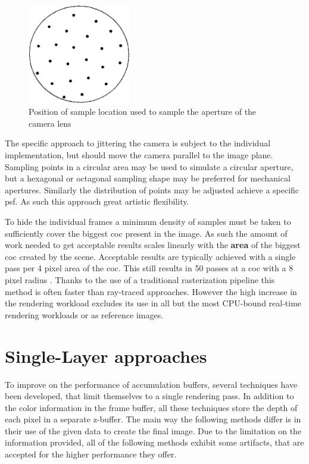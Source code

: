 \begin{figure}
\begin{center}
    \includegraphics[width=0.4\textwidth]{images/sample-locations.png}
\end{center}
\caption{Position of sample location used to sample the aperture of the camera lens \cite{Haeberli.1990}}
\label{fig:sample-pos}
\end{figure}

The specific approach to jittering the camera is subject to the individual implementation, but should move the camera parallel to the image plane.
Sampling points in a circular area may be used to simulate a circular aperture, but a hexagonal or octagonal sampling shape may be preferred for mechanical apertures.
Similarly the distribution of points may be adjusted achieve a specific \gls{psf}.
As such this approach great artistic flexibility.

To hide the individual frames a minimum density of samples must be taken to sufficiently cover the biggest \gls{coc} present in the image.
As such the amount of work needed to get acceptable results scales linearly with the \textbf{area} of the biggest \gls{coc} created by the scene.
Acceptable results are typically achieved with a single pass per 4 pixel area of the \gls{coc}.
This still results in 50 passes at a \gls{coc} with a 8 pixel radius \cite{Demers.2005}.
Thanks to the use of a traditional rasterization pipeline this method is often faster than ray-traced approaches.
However the high increase in the rendering workload excludes its use in all but the most CPU-bound real-time rendering workloads or as reference images.

\section{Single-Layer approaches}
To improve on the performance of accumulation buffers, several techniques have been developed, that limit themselves to a single rendering pass.
In addition to the color information in the frame buffer, all these techniques store the depth of each pixel in a separate z-buffer.
The main way the following methods differ is in their use of the given data to create the final image.
Due to the limitation on the information provided, all of the following methods exhibit some artifacts, that are accepted for the higher performance they offer.


